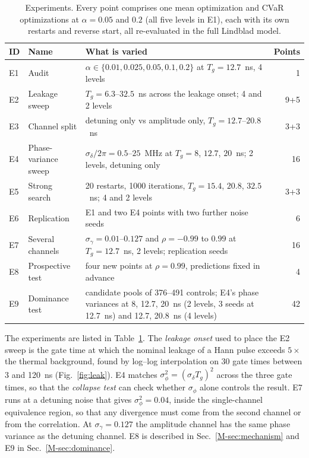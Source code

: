\documentclass[aps,pra,onecolumn,notitlepage,superscriptaddress,nofootinbib,floatfix]{revtex4-2}
\begin{document}
\begin{table}[htbp]
\centering\small
\begin{tabular}{@{}llp{}r@{}}
\toprule
ID & Name & What is varied & Points\\
\midrule
E1 & Audit & $\alpha\in\{0.01,0.025,0.05,0.1,0.2\}$ at $T_g=12.7$~ns, 4 levels & 1\\
E2 & Leakage sweep & $T_g=6.3$--$32.5$~ns across the leakage onset; 4 and 2 levels & 9+5\\
E3 & Channel split & detuning only vs amplitude only, $T_g=12.7$--$20.8$~ns & 3+3\\
E4 & Phase-variance sweep & $\sigma_\delta/2\pi=0.5$--$25$~MHz at $T_g=8$, $12.7$, $20$~ns; 2 levels, detuning only & 16\\
E5 & Strong search & 20 restarts, 1000 iterations, $T_g=15.4$, $20.8$, $32.5$~ns; 4 and 2 levels & 3+3\\
E6 & Replication & E1 and two E4 points with two further noise seeds & 6\\
E7 & Several channels & $\sigma_\gamma=0.01$--$0.127$ and $\rho=-0.99$ to $0.99$ at $T_g=12.7$~ns, 2 levels; replication seeds & 16\\
E8 & Prospective test & four new points at $\rho=0.99$, predictions fixed in advance & 4\\
E9 & Dominance test & candidate pools of 376--491 controls; E4's phase variances at 8, 12.7, 20~ns (2 levels, 3 seeds at 12.7~ns) and 12.7, 20.8~ns (4 levels) & 42\\
\bottomrule
\end{tabular}
\caption{Experiments. Every point comprises one mean optimization and CVaR
optimizations at $\alpha=0.05$ and $0.2$ (all five levels in E1), each with
its own restarts and reverse start, all re-evaluated in the full Lindblad
model.}
\label{tab:experiments}
\end{table}

The experiments are listed in Table~\ref{tab:experiments}. The
\emph{leakage onset} used to place the E2 sweep is the gate time at which the
nominal leakage of a Hann pulse exceeds $5\times$ the thermal background,
found by log--log interpolation on 30 gate times between 3 and 120~ns
(Fig.~\ref{fig:leak}). E4 matches $\sigma_\phi^2=(\sigma_\delta T_g)^2$ across
the three gate times, so that the \emph{collapse test} can check whether
$\sigma_\phi$ alone controls the result. E7 runs at a detuning noise that
gives $\sigma_\phi^2=0.04$, inside the single-channel equivalence region, so
that any divergence must come from the second channel or from the
correlation. At $\sigma_\gamma=0.127$ the amplitude channel has the same phase
variance as the detuning channel. E8 is described in Sec.~\ref{M-sec:mechanism} and E9 in Sec.~\ref{M-sec:dominance}.
\end{document}
